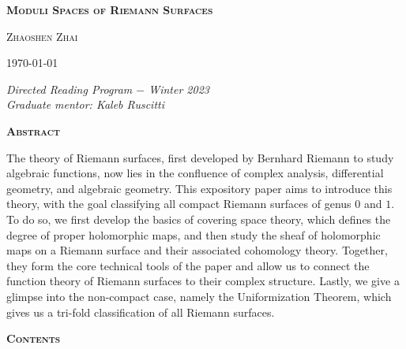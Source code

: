 \pagestyle{empty}
\begin{center}
    \Large\textbf{\textsc{Moduli Spaces of Riemann Surfaces}}
    \\[1.2\baselineskip]
    \begin{center}
        \large{\textsc{Zhaoshen Zhai}}
    \end{center}
    \normalsize\today
\end{center}
\vspace*{0.01\textheight}
\hspace{0.2in}\textit{Directed Reading Program $-$ Winter 2023}
\\[0.3\baselineskip]
\hspace*{0.19in}\textit{Graduate mentor: Kaleb Ruscitti}
\\[0.3\baselineskip]
\begin{center}
    \textsc{\bfseries Abstract}
    \\[1.5\baselineskip]
    \begin{minipage}{0.8\textwidth}
        The theory of Riemann surfaces, first developed by Bernhard Riemann to study algebraic functions, now lies in the confluence of complex analysis, differential geometry, and algebraic geometry. This expository paper aims to introduce this theory, with the goal classifying all compact Riemann surfaces of genus $0$ and $1$. To do so, we first develop the basics of covering space theory, which defines the degree of proper holomorphic maps, and then study the sheaf of holomorphic maps on a Riemann surface and their associated cohomology theory. Together, they form the core technical tools of the paper and allow us to connect the function theory of Riemann surfaces to their complex structure. Lastly, we give a glimpse into the non-compact case, namely the Uniformization Theorem, which gives us a tri-fold classification of all Riemann surfaces.
    \end{minipage}
\end{center}
\vspace*{0.02\textheight}
\begin{center}
    \textsc{\bfseries Contents}
\end{center}

\toccontents
\clearpage
\pagestyle{fancyplain}
\fancyhead[L,C,R]{}
\fancyfoot[L,R]{}
\fancyfoot[C]{\thepage}
\renewcommand{\headrulewidth}{0pt}
\setcounter{page}{1}
